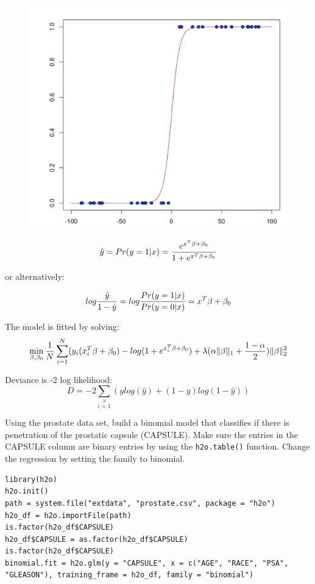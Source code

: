\begin{figure}[h]
\centering
\includegraphics[scale=0.5]{images/scurve.png}
\end{figure}

\[ \hat{y} = Pr(y = 1|x) = {e^{x^T\beta + \beta_0} \over 1 + e^{x^T \beta + \beta_0} } \]

or alternatively:

\[log {\hat{y} \over 1- \hat{y}} = log{Pr(y=1|x) \over Pr(y=0|x)} = x^T \beta + \beta_0\]

The model is fitted by solving:
\[  \min\limits_{\beta,\beta_0} { {1 \over N}\sum\limits_{i=1}\limits^{N}(y_i (x_i^{T}\beta  + \beta_0) - log (1 + e^{x_i^{T}\beta  + \beta_0} )  + \lambda (\alpha \|\beta \|_1 + {1-\alpha \over 2}) \| \beta \|_2^2} \]

Deviance is -2 log likelihood:
\[D = -2\sum\limits_{i=1}\limits^{N}{(y log(\hat{y}) + (1 - y)log(1-\hat{y})  )}\]

\waterExampleInR

Using the prostate data set, build a binomial model that classifies if there is penetration of the prostatic
capsule (CAPSULE). Make sure the entries in the CAPSULE column are binary entries by using the \texttt{h2o.table()}
function. Change the regression by setting the family to binomial.

\begin{lstlisting}[style=R]
library(h2o)
h2o.init()
path = system.file("extdata", "prostate.csv", package = "h2o")
h2o_df = h2o.importFile(path)
is.factor(h2o_df$CAPSULE)
h2o_df$CAPSULE = as.factor(h2o_df$CAPSULE)
is.factor(h2o_df$CAPSULE)
binomial.fit = h2o.glm(y = "CAPSULE", x = c("AGE", "RACE", "PSA", "GLEASON"), training_frame = h2o_df, family = "binomial")
\end{lstlisting}


